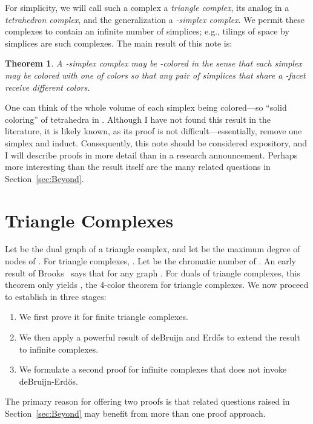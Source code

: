 \pdfoutput=1  \documentclass[]{article}
\newtheorem{theorem}{{\bf Theorem}}
\newcommand{\thmlab}[1]{\label{thm:#1}}
\newcommand{\seclab}[1]{\label{sec:#1}}
\newcommand{\secref}[1]{\ref{sec:#1}}
\begin{document}
For simplicity, we will call such a complex a \emph{triangle complex},
its analog in  a \emph{tetrahedron complex},
and the generalization a \emph{-simplex complex}.
We permit these complexes to contain an infinite number of simplices;
e.g., tilings of space by simplices are such complexes.
The main result of this note is:
\begin{theorem}
A -simplex complex may be -colored in the sense that each
simplex may be colored with one of  colors
so that any pair of simplices that share
a -facet receive different colors.
\thmlab{main}
\end{theorem}
One can think of the whole volume of each simplex being colored---so
``solid coloring'' of tetrahedra in .
Although I have not found this result in the literature,
it is likely known, as its proof is not difficult---essentially,
remove one simplex and induct.
Consequently, this
note should be considered expository,
and I will describe proofs in more detail than in a research announcement.
Perhaps more interesting than the result itself 
are the many related questions in Section~\secref{Beyond}.

\section{Triangle Complexes}
\seclab{TriangleComplexes}
Let  be the dual graph of a triangle complex, and
let  be the maximum degree of nodes of .
For triangle complexes, .
Let  be the chromatic number of .
An early result of Brooks~\cite{b-ocnn-41}
says that
 for any graph .
For duals of triangle complexes, this theorem only
yields , the 4-color theorem for triangle complexes.
We now proceed to establish  in three stages:
\begin{enumerate}
\item We first prove it for finite triangle complexes.
\item We then apply a powerful result of deBruijn and  Erd\H{o}s to
  extend
the result to infinite complexes.
\item We formulate a second proof for infinite complexes that does not
invoke deBruijn-Erd\H{o}s.
\end{enumerate}
The primary reason for offering two proofs is that related questions
raised
in Section~\secref{Beyond} may benefit from more than one proof
approach.
\end{document}
